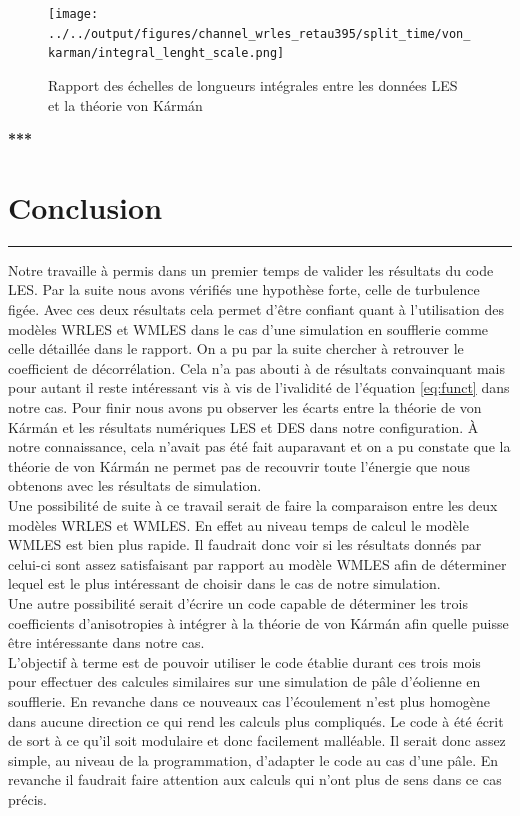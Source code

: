\documentclass[12pt]{article}
\theoremstyle{plain}
\theoremstyle{remark}
\begin{document}
\begin{figure}[H]
	\begin{center}
		\texttt{[image: ../../output/figures/channel\_wrles\_retau395/split\_time/von\_karman/integral\_lenght\_scale.png]}
		\caption{Rapport des échelles de longueurs intégrales entre les données LES et la théorie von Kármán}
		\label{fig:vk_integral_scale}
	\end{center}
\end{figure}
	


\begin{center}
	\large \bf{***}
\end{center}

\vspace{0.3cm}
\section{Conclusion}
\noindent\rule{\linewidth}{2pt}
\vspace{0.1cm}

Notre travaille à permis dans un premier temps de valider les résultats du code LES. Par la suite nous avons vérifiés une hypothèse forte, celle de turbulence figée. Avec ces deux résultats cela permet d'être confiant quant à l'utilisation des modèles WRLES et WMLES dans le cas d'une simulation en soufflerie comme celle détaillée dans le rapport. On a pu par la suite chercher à retrouver le coefficient de décorrélation. Cela n'a pas abouti à de résultats convainquant mais pour autant il reste intéressant vis à vis de l'ivalidité de l'équation \ref{eq:funct} dans notre cas. Pour finir nous avons pu observer les écarts entre la théorie de von Kármán et les résultats numériques LES et DES dans notre configuration. À notre connaissance, cela n'avait pas été fait auparavant et on a pu constate que la théorie de von Kármán ne permet pas de recouvrir toute l'énergie que nous obtenons avec les résultats de simulation. \\ 
Une possibilité de suite à ce travail serait de faire la comparaison entre les deux modèles WRLES et WMLES. En effet au niveau temps de calcul le modèle WMLES est bien plus rapide. Il faudrait donc voir si les résultats donnés par celui-ci sont assez satisfaisant par rapport au modèle WMLES afin de déterminer lequel est le plus intéressant de choisir dans le cas de notre simulation. \\
Une autre possibilité serait d'écrire un code capable de déterminer les trois coefficients d'anisotropies à intégrer à la théorie de von Kármán afin quelle puisse être intéressante dans notre cas.\\
L'objectif à terme est de pouvoir utiliser le code établie durant ces trois mois pour effectuer des calcules similaires sur une simulation de pâle d'éolienne en soufflerie. En revanche dans ce nouveaux cas l'écoulement n'est plus homogène dans aucune direction ce qui rend les calculs plus compliqués. Le code à été écrit de sort à ce qu'il soit modulaire et donc facilement malléable. Il serait donc assez simple, au niveau de la programmation, d'adapter le code au cas d'une pâle. En revanche il faudrait faire attention aux calculs qui n'ont plus de sens dans ce cas précis.
				
\end{document}
